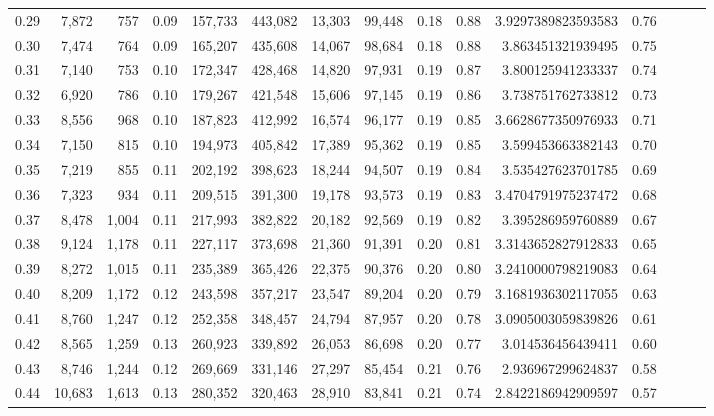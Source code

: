 \begin{tabular}{rrrrrrrrrrrrrrr}
0.29 &   7,872 &    757 &  0.09 &  157,733 &  443,082 &   13,303 &   99,448 &  0.18 &  0.88 &    3.9297389823593583 &      0.76 \\
0.30 &   7,474 &    764 &  0.09 &  165,207 &  435,608 &   14,067 &   98,684 &  0.18 &  0.88 &     3.863451321939495 &      0.75 \\
0.31 &   7,140 &    753 &  0.10 &  172,347 &  428,468 &   14,820 &   97,931 &  0.19 &  0.87 &     3.800125941233337 &      0.74 \\
0.32 &   6,920 &    786 &  0.10 &  179,267 &  421,548 &   15,606 &   97,145 &  0.19 &  0.86 &     3.738751762733812 &      0.73 \\
0.33 &   8,556 &    968 &  0.10 &  187,823 &  412,992 &   16,574 &   96,177 &  0.19 &  0.85 &    3.6628677350976933 &      0.71 \\
0.34 &   7,150 &    815 &  0.10 &  194,973 &  405,842 &   17,389 &   95,362 &  0.19 &  0.85 &     3.599453663382143 &      0.70 \\
0.35 &   7,219 &    855 &  0.11 &  202,192 &  398,623 &   18,244 &   94,507 &  0.19 &  0.84 &     3.535427623701785 &      0.69 \\
0.36 &   7,323 &    934 &  0.11 &  209,515 &  391,300 &   19,178 &   93,573 &  0.19 &  0.83 &    3.4704791975237472 &      0.68 \\
0.37 &   8,478 &  1,004 &  0.11 &  217,993 &  382,822 &   20,182 &   92,569 &  0.19 &  0.82 &     3.395286959760889 &      0.67 \\
0.38 &   9,124 &  1,178 &  0.11 &  227,117 &  373,698 &   21,360 &   91,391 &  0.20 &  0.81 &    3.3143652827912833 &      0.65 \\
0.39 &   8,272 &  1,015 &  0.11 &  235,389 &  365,426 &   22,375 &   90,376 &  0.20 &  0.80 &    3.2410000798219083 &      0.64 \\
0.40 &   8,209 &  1,172 &  0.12 &  243,598 &  357,217 &   23,547 &   89,204 &  0.20 &  0.79 &    3.1681936302117055 &      0.63 \\
0.41 &   8,760 &  1,247 &  0.12 &  252,358 &  348,457 &   24,794 &   87,957 &  0.20 &  0.78 &    3.0905003059839826 &      0.61 \\
0.42 &   8,565 &  1,259 &  0.13 &  260,923 &  339,892 &   26,053 &   86,698 &  0.20 &  0.77 &     3.014536456439411 &      0.60 \\
0.43 &   8,746 &  1,244 &  0.12 &  269,669 &  331,146 &   27,297 &   85,454 &  0.21 &  0.76 &     2.936967299624837 &      0.58 \\
0.44 &  10,683 &  1,613 &  0.13 &  280,352 &  320,463 &   28,910 &   83,841 &  0.21 &  0.74 &    2.8422186942909597 &      0.57 \\

\end{tabular}
